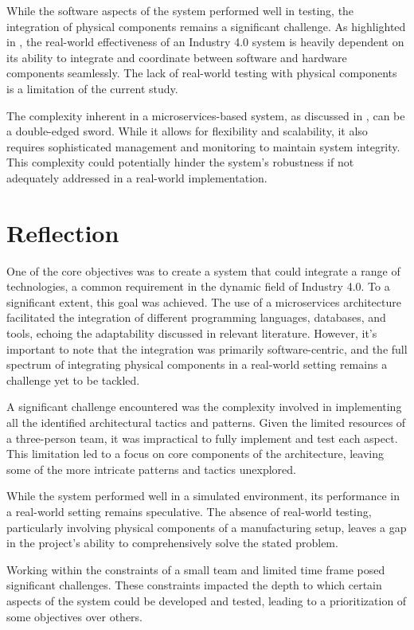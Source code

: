 \documentclass[conference]{IEEEtran}
\begin{document}
While the software aspects of the system performed well in testing, the integration of physical components remains a significant challenge. As highlighted in \cite{UnifiedArchitecturePowering}, the real-world effectiveness of an Industry 4.0 system is heavily dependent on its ability to integrate and coordinate between software and hardware components seamlessly. The lack of real-world testing with physical components is a limitation of the current study.

The complexity inherent in a microservices-based system, as discussed in \cite{DevOpsForCPS}, can be a double-edged sword. While it allows for flexibility and scalability, it also requires sophisticated management and monitoring to maintain system integrity. This complexity could potentially hinder the system's robustness if not adequately addressed in a real-world implementation.

\section{Reflection}

One of the core objectives was to create a system that could integrate a range of technologies, a common requirement in the dynamic field of Industry 4.0. To a significant extent, this goal was achieved. The use of a microservices architecture facilitated the integration of different programming languages, databases, and tools, echoing the adaptability discussed in relevant literature. However, it's important to note that the integration was primarily software-centric, and the full spectrum of integrating physical components in a real-world setting remains a challenge yet to be tackled.

A significant challenge encountered was the complexity involved in implementing all the identified architectural tactics and patterns. Given the limited resources of a three-person team, it was impractical to fully implement and test each aspect. This limitation led to a focus on core components of the architecture, leaving some of the more intricate patterns and tactics unexplored.

While the system performed well in a simulated environment, its performance in a real-world setting remains speculative. The absence of real-world testing, particularly involving physical components of a manufacturing setup, leaves a gap in the project's ability to comprehensively solve the stated problem.

Working within the constraints of a small team and limited time frame posed significant challenges. These constraints impacted the depth to which certain aspects of the system could be developed and tested, leading to a prioritization of some objectives over others.
\end{document}

